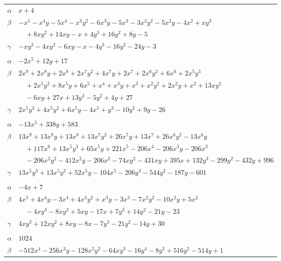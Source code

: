 \documentclass[11pt]{article}
\begin{document}
\begin{longtable}{@{}ll@{}}
$\alpha$ & $x+4$\\
$\beta$ & $-x^{5}-x^{4}y-5x^{4}-x^{3}y^{2}-6x^{3}y-5x^{3}-3x^{2}y^{2}-5x^{2}y-4x^{2}+xy^{3}$\\
 & $\quad +8xy^{2}+14xy-x+4y^{3}+16y^{2}+8y-5$\\
$\gamma$ & $-xy^{3}-4xy^{2}-6xy-x-4y^{3}-16y^{2}-24y-3$\\
\addlinespace[3pt]
\multicolumn{2}{@{}l}{$\{i,j\}=\{10,20\}$, $k_{ij}=3\cdot 5$}\\
$\alpha$ & $-2x^{5}+12y+17$\\
$\beta$ & $2x^{9}+2x^{8}y+2x^{8}+2x^{7}y^{2}+4x^{7}y+2x^{7}+2x^{6}y^{2}+6x^{6}+2x^{5}y^{3}$\\
 & $\quad +2x^{5}y^{2}+8x^{5}y+6x^{5}+x^{4}+x^{3}y+x^{3}+x^{2}y^{2}+2x^{2}y+x^{2}+13xy^{2}$\\
 & $\quad -6xy+27x+13y^{3}-5y^{2}+4y+27$\\
$\gamma$ & $2x^{5}y^{3}+4x^{5}y^{2}+6x^{5}y-4x^{5}+y^{3}-10y^{2}+9y-26$\\
\addlinespace[3pt]
\multicolumn{2}{@{}l}{$\{i,j\}=\{10,30\}$, $k_{ij}=3\cdot 5\cdot 7^{2}$}\\
$\alpha$ & $-13x^{5}+338y+583$\\
$\beta$ & $13x^{9}+13x^{8}y+13x^{8}+13x^{7}y^{2}+26x^{7}y+13x^{7}+26x^{6}y^{2}-13x^{6}y$\\
 & $\quad +117x^{6}+13x^{5}y^{3}+65x^{5}y+221x^{5}-206x^{4}-206x^{3}y-206x^{3}$\\
 & $\quad -206x^{2}y^{2}-412x^{2}y-206x^{2}-74xy^{2}-431xy+395x+132y^{3}-299y^{2}-432y+996$\\
$\gamma$ & $13x^{5}y^{3}+13x^{5}y^{2}+52x^{5}y-104x^{5}-206y^{3}-544y^{2}-187y-601$\\
\addlinespace[3pt]
\multicolumn{2}{@{}l}{$\{i,j\}=\{10,34\}$, $k_{ij}=3^{4}$}\\
$\alpha$ & $-4x+7$\\
$\beta$ & $4x^{5}+4x^{4}y-3x^{4}+4x^{3}y^{2}+x^{3}y-3x^{3}-7x^{2}y^{2}-10x^{2}y+5x^{2}$\\
 & $\quad -4xy^{3}-8xy^{2}+5xy-17x+7y^{3}+14y^{2}-21y-23$\\
$\gamma$ & $4xy^{3}+12xy^{2}+8xy-8x-7y^{3}-21y^{2}-14y+30$\\
\addlinespace[3pt]
\multicolumn{2}{@{}l}{$\{i,j\}=\{11,12\}$, $k_{ij}=3^{2}\cdot 5\cdot 7\cdot 13$}\\
$\alpha$ & $1024$\\
$\beta$ & $-512x^{4}-256x^{3}y-128x^{2}y^{2}-64xy^{3}-16y^{4}-8y^{3}+516y^{2}-514y+1$\\

\end{longtable}
\end{document}
